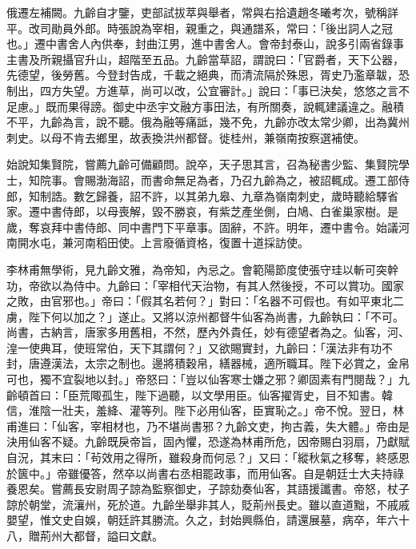 \begin{pinyinscope}
 俄遷左補闕。九齡自才鑒，吏部試拔萃與舉者，常與右拾遺趙冬曦考次，號稱詳平。改司勛員外郎。時張說為宰相，親重之，與通譜系，常曰：「後出詞人之冠也。」遷中書舍人內供奉，封曲江男，進中書舍人。會帝封泰山，說多引兩省錄事主書及所親攝官升山，超階至五品。九齡當草詔，謂說曰：「官爵者，天下公器，先德望，後勞舊。今登封告成，千載之絕典，而清流隔於殊恩，胥史乃濫章韍，恐制出，四方失望。方進草，尚可以改，公宜審計。」說曰：「事已決矣，悠悠之言不足慮。」既而果得謗。御史中丞宇文融方事田法，有所關奏，說輒建議違之。融積不平，九齡為言，說不聽。俄為融等痛詆，幾不免，九齡亦改太常少卿，出為冀州刺史。以母不肯去鄉里，故表換洪州都督。徙桂州，兼嶺南按察選補使。



 始說知集賢院，嘗薦九齡可備顧問。說卒，天子思其言，召為秘書少監、集賢院學士，知院事。會賜渤海詔，而書命無足為者，乃召九齡為之，被詔輒成。遷工部侍郎，知制誥。數乞歸養，詔不許，以其弟九皋、九章為嶺南刺史，歲時聽給驛省家。遷中書侍郎，以母喪解，毀不勝哀，有紫芝產坐側，白鳩、白雀巢家樹。是歲，奪哀拜中書侍郎、同中書門下平章事。固辭，不許。明年，遷中書令。始議河南開水屯，兼河南稻田使。上言廢循資格，復置十道採訪使。



 李林甫無學術，見九齡文雅，為帝知，內忌之。會範陽節度使張守珪以斬可突幹功，帝欲以為侍中。九齡曰：「宰相代天治物，有其人然後授，不可以賞功。國家之敗，由官邪也。」帝曰：「假其名若何？」對曰：「名器不可假也。有如平東北二虜，陛下何以加之？」遂止。又將以涼州都督牛仙客為尚書，九齡執曰：「不可。尚書，古納言，唐家多用舊相，不然，歷內外貴任，妙有德望者為之。仙客，河、湟一使典耳，使班常伯，天下其謂何？」又欲賜實封，九齡曰：「漢法非有功不封，唐遵漢法，太宗之制也。邊將積穀帛，繕器械，適所職耳。陛下必賞之，金帛可也，獨不宜裂地以封。」帝怒曰：「豈以仙客寒士嫌之邪？卿固素有門閱哉？」九齡頓首曰：「臣荒陬孤生，陛下過聽，以文學用臣。仙客擢胥史，目不知書。韓信，淮陰一壯夫，羞絳、灌等列。陛下必用仙客，臣實恥之。」帝不悅。翌日，林甫進曰：「仙客，宰相材也，乃不堪尚書邪？九齡文吏，拘古義，失大體。」帝由是決用仙客不疑。九齡既戾帝旨，固內懼，恐遂為林甫所危，因帝賜白羽扇，乃獻賦自況，其末曰：「茍效用之得所，雖殺身而何忌？」又曰：「縱秋氣之移奪，終感恩於篋中。」帝雖優答，然卒以尚書右丞相罷政事，而用仙客。自是朝廷士大夫持祿養恩矣。嘗薦長安尉周子諒為監察御史，子諒劾奏仙客，其語援讖書。帝怒，杖子諒於朝堂，流瀼州，死於道。九齡坐舉非其人，貶荊州長史。雖以直道黜，不戚戚嬰望，惟文史自娛，朝廷許其勝流。久之，封始興縣伯，請還展墓，病卒，年六十八，贈荊州大都督，謚曰文獻。




\end{pinyinscope}
